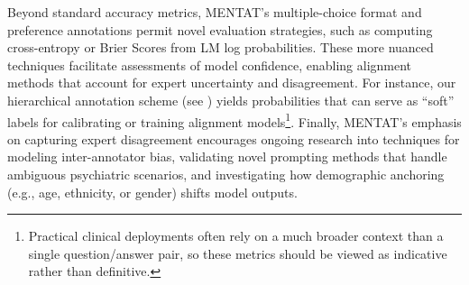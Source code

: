 Beyond standard accuracy metrics, MENTAT’s multiple-choice format and preference annotations permit novel evaluation strategies, such as computing cross-entropy or Brier Scores from LM log probabilities. 
These more nuanced techniques facilitate assessments of model confidence, enabling alignment methods that account for expert uncertainty and disagreement. For instance, our hierarchical annotation scheme (see ) yields probabilities that can serve as “soft” labels for calibrating or training alignment models\footnote{Practical clinical deployments often rely on a much broader context than a single question/answer pair, so these metrics should be viewed as indicative rather than definitive.}. 
Finally, MENTAT’s emphasis on capturing expert disagreement encourages ongoing research into techniques for modeling inter-annotator bias, validating novel prompting methods that handle ambiguous psychiatric scenarios, and investigating how demographic anchoring (e.g., age, ethnicity, or gender) shifts model outputs. 


